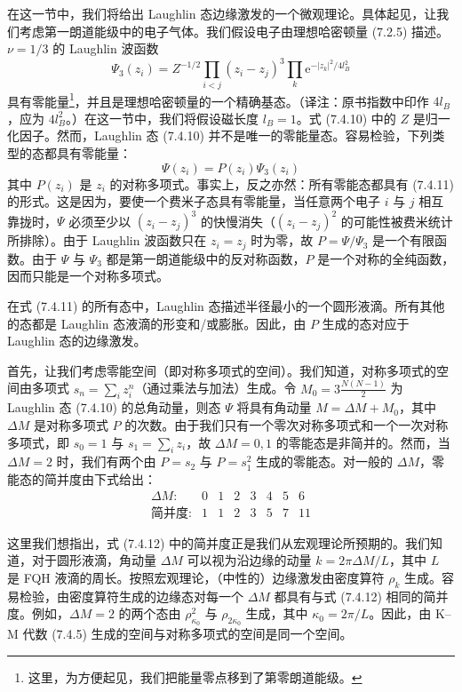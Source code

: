 在这一节中，我们将给出 Laughlin 态边缘激发的一个微观理论。具体起见，让我们考虑第一朗道能级中的电子气体。我们假设电子由理想哈密顿量 (7.2.5) 描述。$\nu=1/3$ 的 Laughlin 波函数
\begin{equation*}
\Psi_3(z_i)=Z^{-1/2}\prod_{i<j}(z_i-z_j)^3\prod_k\mathrm{e}^{-|z_k|^2/4l_B^2}
\tag{7.4.10}
\end{equation*}
具有零能量\footnote{这里，为方便起见，我们把能量零点移到了第零朗道能级。}，并且是理想哈密顿量的一个精确基态。（译注：原书指数中印作 $4l_B$，应为 $4l_B^2$。）在这一节中，我们将假设磁长度 $l_B=1$。式 (7.4.10) 中的 $Z$ 是归一化因子。然而，Laughlin 态 (7.4.10) 并不是唯一的零能量态。容易检验，下列类型的态都具有零能量：
\begin{equation*}
\Psi(z_i)=P(z_i)\Psi_3(z_i)
\tag{7.4.11}
\end{equation*}
其中 $P(z_i)$ 是 $z_i$ 的对称多项式。事实上，反之亦然：所有零能态都具有 (7.4.11) 的形式。这是因为，要使一个费米子态具有零能量，当任意两个电子 $i$ 与 $j$ 相互靠拢时，$\Psi$ 必须至少以 $(z_i-z_j)^3$ 的快慢消失（$(z_i-z_j)^2$ 的可能性被费米统计所排除）。由于 Laughlin 波函数只在 $z_i=z_j$ 时为零，故 $P=\Psi/\Psi_3$ 是一个有限函数。由于 $\Psi$ 与 $\Psi_3$ 都是第一朗道能级中的反对称函数，$P$ 是一个对称的全纯函数，因而只能是一个对称多项式。

在式 (7.4.11) 的所有态中，Laughlin 态描述半径最小的一个圆形液滴。所有其他的态都是 Laughlin 态液滴的形变和/或膨胀。因此，由 $P$ 生成的态对应于 Laughlin 态的边缘激发。

首先，让我们考虑零能空间（即对称多项式的空间）。我们知道，对称多项式的空间由多项式 $s_n=\sum_iz_i^n$（通过乘法与加法）生成。令 $M_0=3\frac{N(N-1)}{2}$ 为 Laughlin 态 (7.4.10) 的总角动量，则态 $\Psi$ 将具有角动量 $M=\Delta M+M_0$，其中 $\Delta M$ 是对称多项式 $P$ 的次数。由于我们只有一个零次对称多项式和一个一次对称多项式，即 $s_0=1$ 与 $s_1=\sum_iz_i$，故 $\Delta M=0,1$ 的零能态是非简并的。然而，当 $\Delta M=2$ 时，我们有两个由 $P=s_2$ 与 $P=s_1^2$ 生成的零能态。对一般的 $\Delta M$，零能态的简并度由下式给出：
\begin{equation*}
\begin{array}{cccccccc}
\Delta M: & 0 & 1 & 2 & 3 & 4 & 5 & 6\\
\text{简并度}: & 1 & 1 & 2 & 3 & 5 & 7 & 11
\end{array}
\tag{7.4.12}
\end{equation*}

这里我们想指出，式 (7.4.12) 中的简并度正是我们从宏观理论所预期的。我们知道，对于圆形液滴，角动量 $\Delta M$ 可以视为沿边缘的动量 $k=2\pi\Delta M/L$，其中 $L$ 是 FQH 液滴的周长。按照宏观理论，（中性的）边缘激发由密度算符 $\rho_k$ 生成。容易检验，由密度算符生成的边缘态对每一个 $\Delta M$ 都具有与式 (7.4.12) 相同的简并度。例如，$\Delta M=2$ 的两个态由 $\rho_{\kappa_0}^2$ 与 $\rho_{2\kappa_0}$ 生成，其中 $\kappa_0=2\pi/L$。因此，由 K--M 代数 (7.4.5) 生成的空间与对称多项式的空间是同一个空间。

